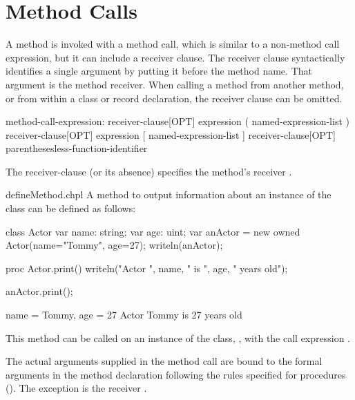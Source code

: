 \section{Method Calls}
\label{Method_Calls}

A method is invoked with a method call, which is similar to a non-method
call expression, but it can include a receiver clause. The receiver
clause syntactically identifies a single argument by
putting it before the method name. That argument is the method receiver.
When calling a method from another method, or from within a class or
record declaration, the receiver clause can be omitted.

\begin{syntax}
method-call-expression:
  receiver-clause[OPT] expression ( named-expression-list )
  receiver-clause[OPT] expression [ named-expression-list ]
  receiver-clause[OPT] parenthesesless-function-identifier
\end{syntax}

The receiver-clause (or its absence) specifies the method's receiver
.

\begin{chapelexample}{defineMethod.chpl}
A method to output information about an instance of the 
class can be defined as follows:
\begin{chapelpre}
class Actor {
  var name: string;
  var age: uint;
}
var anActor = new owned Actor(name="Tommy", age=27);
writeln(anActor);
\end{chapelpre}
\begin{chapel}
proc Actor.print() {
  writeln("Actor ", name, " is ", age, " years old");
}
\end{chapel}
\begin{chapelpost}
anActor.print();
\end{chapelpost}
\begin{chapeloutput}
{name = Tommy, age = 27}
Actor Tommy is 27 years old
\end{chapeloutput}
This method can be called on an instance of the 
class, , with the call expression .
\end{chapelexample}

The actual arguments supplied in the method call are bound to the
formal arguments in the method declaration following the rules specified for
procedures (). The exception is the receiver
.

